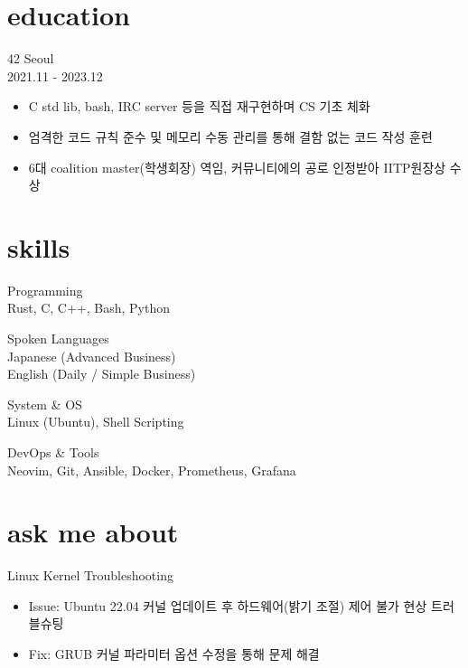 \documentclass[10pt, a4paper]{article}
\newcommand{\descstyle}{\lightfont\fontsize{9.5pt}{10pt}\selectfont}
\newcommand{\dates}[1]{\hfill {\descstyle\color{lightGray} #1}}
\begin{document}
\noindent
\begin{minipage}[t]{0.34\textwidth} %

    \section*{\huge{education}}
    42 Seoul \\ 
    \dates{2021.11 - 2023.12}
    \vspace{0.3em}
    
    {\descstyle
    \begin{itemize}[label=\textbullet]
        \item C std lib, bash, IRC server 등을 직접 재구현하며 CS 기초 체화
        \item 엄격한 코드 규칙 준수 및 메모리 수동 관리를 통해 결함 없는 코드 작성 훈련
        \item 6대 coalition master(학생회장) 역임, 커뮤니티에의 공로 인정받아 IITP원장상 수상
    \end{itemize}
    }


    \vspace{1.5em}

    \section*{\huge{skills}}
    Programming \\
    {\descstyle Rust, C, C++, Bash, Python }
    
    \vspace{0.8em}
    
    Spoken Languages \\
    {\descstyle Japanese (Advanced Business) \\
    English (Daily / Simple Business) }     

    \vspace{0.8em}
    System \& OS \\
    {\descstyle Linux (Ubuntu), Shell Scripting }
    
    \vspace{0.8em}
    DevOps \& Tools \\
    {\descstyle Neovim, Git, Ansible, Docker, Prometheus, Grafana }

    \vspace{1.5em}

    \section*{\huge{ask me about}}
    Linux Kernel Troubleshooting
    \begin{itemize}[label=\textbullet]
        \descstyle 
        \item Issue: Ubuntu 22.04 커널 업데이트 후 하드웨어(밝기 조절) 제어 불가 현상 트러블슈팅
        \item Fix: GRUB 커널 파라미터 옵션 수정을 통해 문제 해결
    \end{itemize}

\end{minipage}
\end{document}
